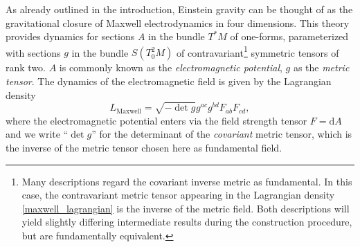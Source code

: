 As already outlined in the introduction, Einstein gravity can be thought of as the gravitational closure of Maxwell electrodynamics in four dimensions. This theory provides dynamics for sections $A$ in the bundle $T^\ast M$ of one-forms, parameterized with sections $g$ in the bundle $S(T^2_0M)$ of contravariant\footnote{Many descriptions regard the covariant inverse metric as fundamental. In this case, the contravariant metric tensor appearing in the Lagrangian density \eqref{maxwell_lagrangian} is the inverse of the metric field. Both descriptions will yield slightly differing intermediate results during the construction procedure, but are fundamentally equivalent.} symmetric tensors of rank two. $A$ is commonly known as the \emph{electromagnetic potential}, $g$ as the \emph{metric tensor}. The dynamics of the electromagnetic field is given by the Lagrangian density
\begin{equation}
  L_\text{Maxwell} = \sqrt{-\operatorname{det} g} g^{ac}g^{bd} F_{ab} F_{cd},
\end{equation}
where the electromagnetic potential enters via the field strength tensor $F = \mathrm dA$ and we write ``$\operatorname{det}g$'' for the determinant of the \emph{covariant} metric tensor, which is the inverse of the metric tensor chosen here as fundamental field.

